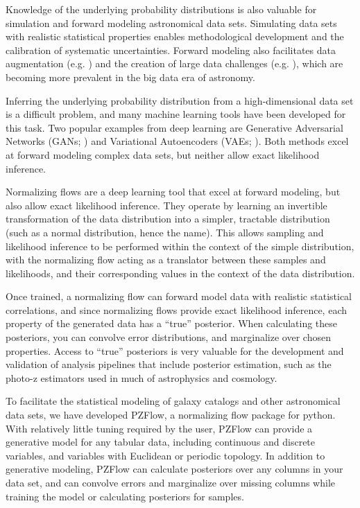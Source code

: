 \documentclass[twocolumn]{aastex631}
\begin{document}
Knowledge of the underlying probability distributions is also valuable for simulation and forward modeling astronomical data sets.
Simulating data sets with realistic statistical properties enables methodological development and the calibration of systematic uncertainties.
Forward modeling also facilitates data augmentation (e.g. \citealt{lokken2022}) and the creation of large data challenges (e.g. \citealt{kessler2019, dc2, cosmodc2}), which are becoming more prevalent in the big data era of astronomy.

Inferring the underlying probability distribution from a high-dimensional data set is a difficult problem, and many machine learning tools have been developed for this task.
Two popular examples from deep learning are Generative Adversarial Networks (GANs; \citealt{goodfellow2014}) and Variational Autoencoders (VAEs; \citealt{kingma2014}).
Both methods excel at forward modeling complex data sets, but neither allow exact likelihood inference.

Normalizing flows are a deep learning tool that excel at forward modeling, but also allow exact likelihood inference.
They operate by learning an invertible transformation of the data distribution into a simpler, tractable distribution (such as a normal distribution, hence the name).
This allows sampling and likelihood inference to be performed within the context of the simple distribution, with the normalizing flow acting as a translator between these samples and likelihoods, and their corresponding values in the context of the data distribution.

Once trained, a normalizing flow can forward model data with realistic statistical correlations, and since normalizing flows provide exact likelihood inference, each property of the generated data has a ``true'' posterior.
When calculating these posteriors, you can convolve error distributions, and marginalize over chosen properties.
Access to ``true'' posteriors is very valuable for the development and validation of analysis pipelines that include posterior estimation, such as the photo-z estimators used in much of astrophysics and cosmology.

To facilitate the statistical modeling of galaxy catalogs and other astronomical data sets, we have developed PZFlow, a normalizing flow package for python.
With relatively little tuning required by the user, PZFlow can provide a generative model for any tabular data, including continuous and discrete variables, and variables with Euclidean or periodic topology.
In addition to generative modeling, PZFlow can calculate posteriors over any columns in your data set, and can convolve errors and marginalize over missing columns while training the model or calculating posteriors for samples.
\end{document}
